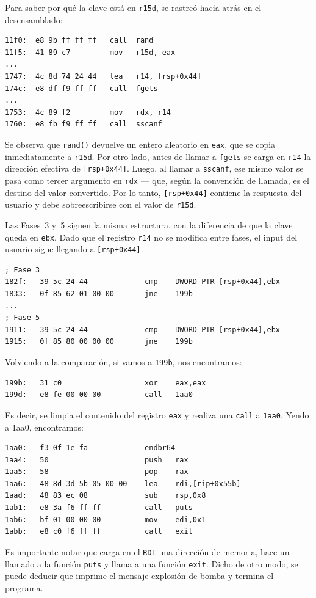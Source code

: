 \documentclass[10pt,a4paper]{article}
\begin{document}
Para saber por qué la clave está en \texttt{r15d}, se rastreó hacia atrás en el desensamblado:

\begin{lstlisting}[style=asmstyle, caption={Cadena de generacion de clave --- Fase 1}]
11f0:  e8 9b ff ff ff   call  rand
11f5:  41 89 c7         mov   r15d, eax
...
1747:  4c 8d 74 24 44   lea   r14, [rsp+0x44]
174c:  e8 df f9 ff ff   call  fgets
...
1753:  4c 89 f2         mov   rdx, r14
1760:  e8 fb f9 ff ff   call  sscanf
\end{lstlisting}

Se observa que \texttt{rand()} devuelve un entero aleatorio en \texttt{eax}, que se copia inmediatamente a \texttt{r15d}. Por otro lado, antes de llamar a \texttt{fgets} se carga en \texttt{r14} la dirección efectiva de \texttt{[rsp+0x44]}. Luego, al llamar a \texttt{sscanf}, ese mismo valor se pasa como tercer argumento en \texttt{rdx} — que, según la convención de llamada, es el destino del valor convertido. Por lo tanto, \texttt{[rsp+0x44]} contiene la respuesta del usuario y debe sobreescribirse con el valor de \texttt{r15d}.

Las Fases~3 y~5 siguen la misma estructura, con la diferencia de que la clave queda en \texttt{ebx}. Dado que el registro \texttt{r14} no se modifica entre fases, el input del usuario sigue llegando a \texttt{[rsp+0x44]}.

\begin{lstlisting}[style=asmstyle, caption={Fase 3 (offset 0x182f) y Fase 5 (offset 0x1911)}]
; Fase 3
182f:	39 5c 24 44          	cmp    DWORD PTR [rsp+0x44],ebx
1833:	0f 85 62 01 00 00    	jne    199b
...
; Fase 5
1911:	39 5c 24 44          	cmp    DWORD PTR [rsp+0x44],ebx
1915:	0f 85 80 00 00 00    	jne    199b
\end{lstlisting}

Volviendo a la comparación, si vamos a \texttt{199b}, nos encontramos:
\begin{lstlisting}[style=asmstyle, caption={Código en \texttt{199b}}]
199b:	31 c0                   xor    eax,eax
199d:	e8 fe 00 00 00       	call   1aa0
\end{lstlisting}
Es decir, se limpia el contenido del registro \texttt{eax} y realiza una \texttt{call} a \texttt{1aa0}. Yendo a 1aa0, encontramos:
\begin{lstlisting}[style=asmstyle, caption={Código en \texttt{1aa0}}]
1aa0:	f3 0f 1e fa           	endbr64
1aa4:	50                      push   rax
1aa5:	58                      pop    rax
1aa6:	48 8d 3d 5b 05 00 00 	lea    rdi,[rip+0x55b]
1aad:	48 83 ec 08          	sub    rsp,0x8
1ab1:	e8 3a f6 ff ff       	call   puts
1ab6:	bf 01 00 00 00       	mov    edi,0x1
1abb:	e8 c0 f6 ff ff          call   exit
\end{lstlisting}
Es importante notar que carga en el \texttt{RDI} una dirección de memoria, hace un llamado a la función \texttt{puts} y llama a una función \texttt{exit}. Dicho de otro modo, se puede deducir que imprime el mensaje explosión de bomba y termina el programa.
\end{document}
